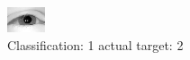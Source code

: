 \begin{figure}[h!]
\begin{center}
\includegraphics[width=0.60\columnwidth]{figures/ID2351_class_1_target_2.png}
\end{center}
\caption{ Classification: 1 actual target: 2}
\label{fig:ID2351_class_1_target_2}
\end{figure}
